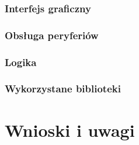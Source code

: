 \documentclass[12pt, eng, twoside, openany, final]{mgr}
\begin{document}
                \subsection{Interfejs graficzny}
                \subsection{Obsługa peryferiów}
                \subsection{Logika}
                \subsection{Wykorzystane biblioteki}
            
\chapter{Wnioski i uwagi}
\thispagestyle{fancy}
  \cite{CleanCode,EffectiveModern,RpiBeginner}




\end{document}
